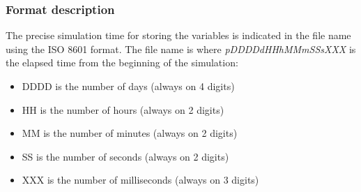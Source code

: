 \subsubsection{Format description}
The precise simulation time for storing the variables is indicated in the file name using the ISO 8601 format. The file name is  where \emph{pDDDDdHHhMMmSSsXXX} is the elapsed time from the beginning of the simulation:
\begin{itemize}
    \item DDDD is the number of days (always on 4 digits)
    \item HH is the number of hours (always on 2 digits)
    \item MM is the number of minutes (always on 2 digits)
    \item SS is the number of seconds (always on 2 digits)
    \item XXX is the number of milliseconds (always on 3 digits)
\end{itemize}

    
